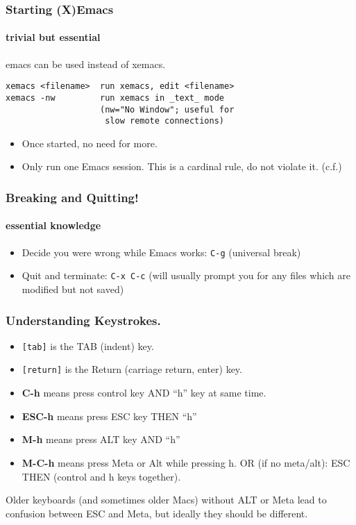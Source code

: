 \documentclass{beamer}
\begin{document}
\begin{frame}[fragile]
  \frametitle{Starting (X)Emacs}
  \framesubtitle{trivial but essential}
  \alert{emacs} can be used instead of \alert{xemacs}.
\begin{verbatim}
xemacs <filename>  run xemacs, edit <filename>
xemacs -nw         run xemacs in _text_ mode
                   (nw="No Window"; useful for 
                    slow remote connections)
\end{verbatim}
  \begin{itemize}
  \item Once started, no need for more.
  \item \alert{Only run one Emacs session}.  This is a cardinal rule,
    do not violate it.
    (c.f.\hyperlink{keystrokes:fileloading}{})
  \end{itemize}
\end{frame}


\begin{frame}[fragile]
  \frametitle{Breaking and Quitting!}
  \framesubtitle{essential knowledge}
  \label{emacs:basics}
  \begin{itemize}
  \item Decide you were wrong while Emacs works: \verb+C-g+  (universal break)
  \item Quit and terminate: \verb+C-x C-c+ (will usually prompt you
    for any files which are modified but not saved)
  \end{itemize}
\end{frame}


\begin{frame}[fragile]
  \frametitle{Understanding Keystrokes.}
  \begin{itemize}
  \item \verb+[tab]+ is the TAB (indent) key.
  \item \verb+[return]+ is the Return (carriage return, enter) key.
  \item \textbf{C-h} means press \alert{control key} AND ``\alert{h}'' key at same time.
  \item \textbf{ESC-h} means press \alert{ESC key} THEN ``\alert{h}''
  \item \textbf{M-h} means press \alert{ALT key} AND ``\alert{h}''
  \item \textbf{M-C-h} means press Meta or Alt while pressing h.  OR
    (if no meta/alt): ESC THEN (control and h keys together).
  \end{itemize}
  Older keyboards (and sometimes older Macs) without ALT or Meta lead
  to confusion between ESC and Meta, but ideally they should be different.
\end{frame}
\end{document}
